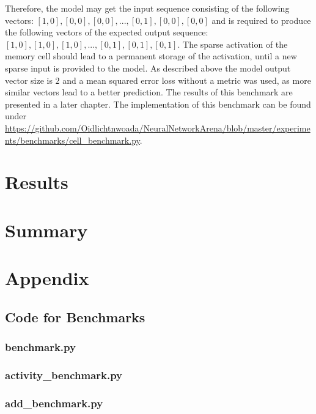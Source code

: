 \documentclass[draft,final]{vutinfth} %
\begin{document}
    Therefore, the model may get the input sequence consisting of the following vectors: $[1,0],[0,0],[0,0],...,[0,1],[0,0],[0,0]$ and is required to produce the following vectors of the expected output sequence: $[1,0],[1,0],[1,0],...,[0,1],[0,1],[0,1]$.
    The sparse activation of the memory cell should lead to a permanent storage of the activation, until a new sparse input is provided to the model.
    As described above the model output vector size is $2$ and a mean squared error loss without a metric was used, as more similar vectors lead to a better prediction.
    The results of this benchmark are presented in a later chapter.
    The implementation of this benchmark can be found under \url{https://github.com/Oidlichtnwoada/NeuralNetworkArena/blob/master/experiments/benchmarks/cell_benchmark.py}.
    
    \chapter{Results}

    \chapter{Summary}

    \chapter{Appendix}
    
    \section{Code for Benchmarks}
    \subsection{benchmark.py}
    
    \subsection{activity\_benchmark.py}
    
    \subsection{add\_benchmark.py}
    
\end{document}
